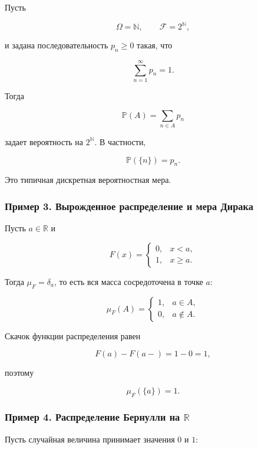 \documentclass[
  11pt,
  a4paper,
]{article}
\begin{document}
Пусть

\[
\Omega=\mathbb N,\qquad
\mathcal F=2^{\mathbb N},
\]

и задана последовательность \(p_n\ge0\) такая, что

\[
\sum_{n=1}^{\infty}p_n=1.
\]

Тогда

\[
\mathbb P(A)=\sum_{n\in A}p_n
\]

задает вероятность на \(2^{\mathbb N}\). В частности,

\[
\mathbb P(\{n\})=p_n.
\]

Это типичная дискретная вероятностная мера.

\subsubsection{Пример 3. Вырожденное распределение и мера
Дирака}\label{ux43fux440ux438ux43cux435ux440-3.-ux432ux44bux440ux43eux436ux434ux435ux43dux43dux43eux435-ux440ux430ux441ux43fux440ux435ux434ux435ux43bux435ux43dux438ux435-ux438-ux43cux435ux440ux430-ux434ux438ux440ux430ux43aux430}

Пусть \(a\in\mathbb R\) и

\[
F(x)=
\begin{cases}
0, & x<a,\\
1, & x\ge a.
\end{cases}
\]

Тогда \(\mu_F=\delta_a\), то есть вся масса сосредоточена в точке \(a\):

\[
\mu_F(A)=
\begin{cases}
1, & a\in A,\\
0, & a\notin A.
\end{cases}
\]

Скачок функции распределения равен

\[
F(a)-F(a-)=1-0=1,
\]

поэтому

\[
\mu_F(\{a\})=1.
\]

\subsubsection{\texorpdfstring{Пример 4. Распределение Бернулли на
\(\mathbb R\)}{Пример 4. Распределение Бернулли на \textbackslash mathbb R}}\label{ux43fux440ux438ux43cux435ux440-4.-ux440ux430ux441ux43fux440ux435ux434ux435ux43bux435ux43dux438ux435-ux431ux435ux440ux43dux443ux43bux43bux438-ux43dux430-mathbb-r}

Пусть случайная величина принимает значения \(0\) и \(1\):
\end{document}
